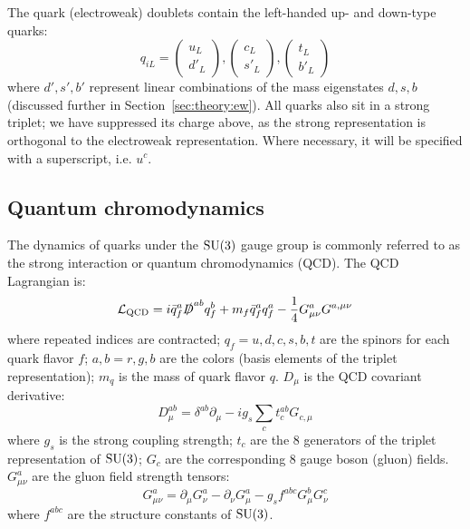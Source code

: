 The quark (electroweak) doublets contain the left-handed up- and down-type quarks:
\begin{equation}
    q_{iL} = 
    \left(\begin{matrix} u_L \\ d'_L \end{matrix}\right),
    \left(\begin{matrix} c_L \\ s'_L \end{matrix}\right),
    \left(\begin{matrix} t_L \\ b'_L \end{matrix}\right)
\end{equation}
where $d',s',b'$ represent linear combinations of the mass eigenstates $d,s,b$ (discussed further in Section~\ref{sec:theory:ew}).
All quarks also sit in a strong triplet; we have suppressed its charge above, as the strong representation is orthogonal to the electroweak representation.
Where necessary, it will be specified with a superscript, i.e. $u^{c}$.

\subsection{Quantum chromodynamics}
The dynamics of quarks under the $\operatorname{\mathrm{SU}}(3)$ gauge group is commonly referred to as the strong interaction or quantum chromodynamics (QCD).
The QCD Lagrangian is:
\begin{equation}
    \mathcal{L}_\mathrm{QCD} = 
        i \bar q^{a}_f \slashed D^{ab} q^{b}_f  
        + m_f \bar{q}^{a}_f q^{a}_f
        - \frac{1}{4} G^{a}_{\mu\nu} G^{a,\mu\nu}
    \label{eq:theory:lqcd}
\end{equation}
where repeated indices are contracted; $q_f=u,d,c,s,b,t$ are the spinors for each quark flavor $f$; $a,b=r,g,b$ are the colors (basis elements of the triplet representation); $m_q$ is the mass of quark flavor $q$.
$D_\mu$ is the QCD covariant derivative:
\begin{equation}
    D_\mu^{ab} = \delta^{ab} \partial_\mu - i g_s \sum_c t^{ab}_c G_{c,\mu}
\end{equation}
where $g_s$ is the strong coupling strength; $t_c$ are the 8 generators of the triplet representation of $\operatorname{\mathrm{SU}}(3)$; $G_c$ are the corresponding 8 gauge boson (gluon) fields. 
$G^a_{\mu\nu}$ are the gluon field strength tensors:
\begin{equation}
    G^a_{\mu\nu} = \partial_\mu G_\nu^a - \partial_\nu G_\mu^a - g_s f^{abc} G_\mu^b G_\nu^c
\end{equation}
where $f^{abc}$ are the structure constants of $\operatorname{\mathrm{SU}}(3)$.

